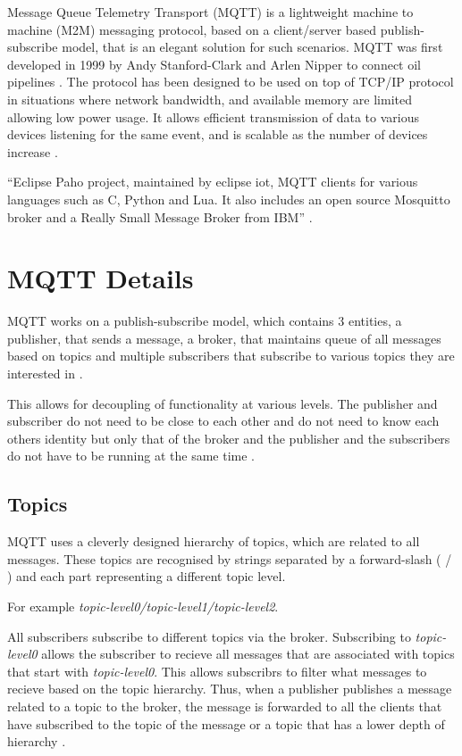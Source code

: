 \documentclass[sigconf]{acmart}
\begin{document}
Message Queue Telemetry Transport (MQTT) is a lightweight machine to machine (M2M) messaging protocol, based on a client/server based publish-subscribe model, that is an elegant solution for such scenarios. MQTT was first  developed in 1999 by Andy Stanford-Clark and Arlen Nipper to connect oil pipelines \cite{hivemq-website}. The protocol has been designed to be used on top of TCP/IP protocol in situations where network bandwidth, and available memory are limited allowing low power usage. It allows efficient transmission of data to various devices listening for the same event, and is scalable as the number of devices increase \cite{mqtt-wiki}\cite{mqtt-official}. 

``Eclipse Paho project, maintained by eclipse iot, MQTT clients for various languages such as C, Python and Lua. It also includes an open source Mosquitto broker and a Really Small Message Broker from IBM'' \cite{mqtt-official}\cite{eclipse-mosquitto}.


\section{MQTT Details}
MQTT works on a publish-subscribe model, which contains 3 entities, a publisher, that sends a message, a broker, that maintains queue of all messages based on topics and multiple subscribers that subscribe to various topics they are interested in \cite{how-mqtt-works}.

This allows for decoupling of functionality at various levels. The publisher and subscriber do not need to be close to each other and do not need to know each others identity but only that of the broker and the publisher and the subscribers do not have to be running at the same time \cite{hivemq-details}.

\subsection{Topics}
MQTT uses a cleverly designed hierarchy of topics, which are related to all messages. These topics are recognised by strings separated by a forward-slash ( / ) and each part representing a different topic level.

For example {\em topic-level0/topic-level1/topic-level2}.

All subscribers subscribe to different topics via the broker. Subscribing to {\em topic-level0} allows the subscriber to recieve all messages that are associated with topics that start with {\em topic-level0}. This allows subscribrs to filter what messages to recieve based on the topic hierarchy.
Thus, when a publisher publishes a message related to a topic to the broker, the message is forwarded to all the clients that have subscribed to the topic of the message or a topic that has a lower depth of hierarchy \cite{hivemq-details} \cite{how-mqtt-works}.
\end{document}
